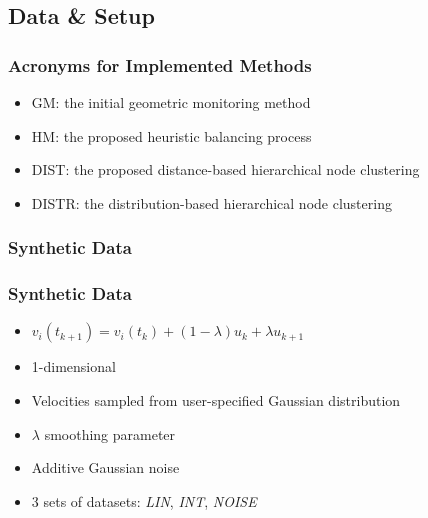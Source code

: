 \documentclass[hyperref={pdfpagelabels=false}]{beamer}
\begin{document}
\subsection{Data \& Setup}
\begin{frame}\frametitle{Acronyms for Implemented Methods}
\begin{itemize}
\item[] GM: the initial geometric monitoring method
\item[] HM: the proposed heuristic balancing process
\item[] DIST: the proposed distance-based hierarchical node clustering
\item[] DISTR: the distribution-based hierarchical node clustering
\end{itemize}
\end{frame}

\subsubsection*{Synthetic Data}
\begin{frame} \frametitle{Synthetic Data}
\begin{itemize}
\item $v_i(t_{k+1})=v_i(t_k) + (1-\lambda)u_{k} + \lambda u_{k+1}$
\item 1-dimensional
\item Velocities sampled from user-specified Gaussian distribution
\item $\lambda$ smoothing parameter
\item Additive Gaussian noise
\item 3 sets of datasets: \emph{LIN}, \emph{INT}, \emph{NOISE}
\end{itemize}
\end{frame}
\end{document}
